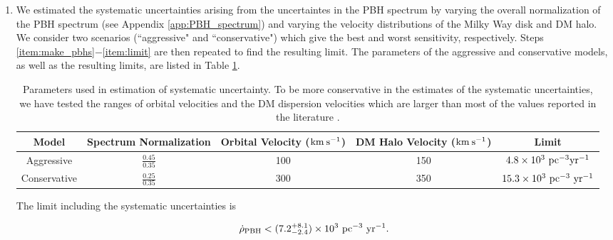 \begin{enumerate}
\item
We estimated the systematic uncertainties arising from the uncertaintes in the PBH spectrum by varying the overall normalization of the PBH spectrum (see Appendix \ref{app:PBH_spectrum}) and varying the velocity distributions of the Milky Way disk and DM halo. We consider two scenarios (``aggressive" and ``conservative") which give the best and worst sensitivity, respectively. Steps \ref{item:make_pbhs}$-$\ref{item:limit} are then repeated to find the resulting limit. The parameters of the aggressive and conservative models, as well as the resulting limits, are listed in Table \ref{table:systematics}.
\begin{table}[h]
\begin{center}
\begin{tabular}{|c c c c c|}
\hline
Model & Spectrum Normalization & Orbital Velocity (${\rm km\: s^{-1}}$) & DM Halo Velocity (${\rm km\: s^{-1}}$) & Limit\\
\hline
Aggressive & $\frac{0.45}{0.35}$ & 100 & 150 & $4.8\times 10^3  \textup{ pc}^{-3}  \textup{yr}^{-1}$ \\
Conservative & $\frac{0.25}{0.35}$ & 300 & 350 & $15.3\times10^3 \textup{ pc}^{-3} \textup{ yr}^{-1}$ \\
\hline
\end{tabular}
\caption{Parameters used in estimation of systematic uncertainty. 
To be more conservative in the estimates of the systematic uncertainties,
we have tested the ranges of orbital velocities and the DM dispersion velocities which are larger than most of the values reported
in the literature
\citep{1999MNRAS.310..645W, 2008ApJ...684.1143X, 2009PASJ...61..227S, 2010ApJ...720L.108G, 2010JCAP...02..030K,
2010MNRAS.402..934M, 2011MNRAS.414.2446M}.}
\label{table:systematics}
\end{center}
\end{table}


The limit including the systematic uncertainties is

\noindent
\begin{equation}
\label{eq:ev_rate}
\dot{\rho}_{\rm PBH} < (7.2^{+8.1}_{-2.4} ) \times 10^3 \textup{ pc}^{-3} \textup{ yr}^{-1}.
\end{equation}
\end{enumerate}

